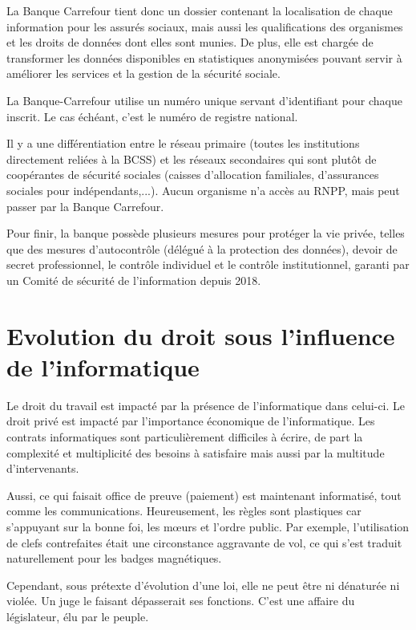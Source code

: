 \documentclass[fleqn,letterpaper, 12pt]{article}
\begin{document}
	La Banque Carrefour tient donc un dossier contenant la localisation de chaque information pour les assurés sociaux, mais aussi les qualifications des organismes et les droits de données dont elles sont munies. De plus, elle est chargée de transformer les données disponibles en statistiques anonymisées pouvant servir à améliorer les services et la gestion de la sécurité sociale.
	
	La Banque-Carrefour utilise un numéro unique servant d'identifiant pour chaque inscrit. Le cas échéant, c'est le numéro de registre national.
	
	Il y a une différentiation entre le réseau primaire (toutes les institutions directement reliées à la BCSS) et les réseaux secondaires qui sont plutôt de coopérantes de sécurité sociales (caisses d'allocation familiales, d'assurances sociales pour indépendants,...). Aucun organisme n'a accès au RNPP, mais peut passer par la Banque Carrefour.
	
	Pour finir, la banque possède plusieurs mesures pour protéger la vie privée, telles que des mesures d'autocontrôle (délégué à la protection des données), devoir de secret professionnel, le contrôle individuel et le contrôle institutionnel, garanti par un Comité de sécurité de l'information depuis 2018.
	
	
	\section{Evolution du droit sous l'influence de l'informatique}
	
	Le droit du travail est impacté par la présence de l'informatique dans celui-ci. Le droit privé est impacté par l'importance économique de l'informatique. Les contrats informatiques sont particulièrement difficiles à écrire, de part la complexité et multiplicité des besoins à satisfaire mais aussi par la multitude d'intervenants. 
	
	Aussi, ce qui faisait office de preuve (paiement) est maintenant informatisé, tout comme les communications. Heureusement, les règles sont plastiques car s'appuyant sur la bonne foi, les m\oe urs et l'ordre public. Par exemple, l'utilisation de clefs contrefaites était une circonstance aggravante de vol, ce qui s'est traduit naturellement pour les badges magnétiques.
	
	Cependant, sous prétexte d'évolution d'une loi, elle ne peut être ni dénaturée ni violée. Un juge le faisant dépasserait ses fonctions. C'est une affaire du législateur, élu par le peuple.
	
\end{document}

